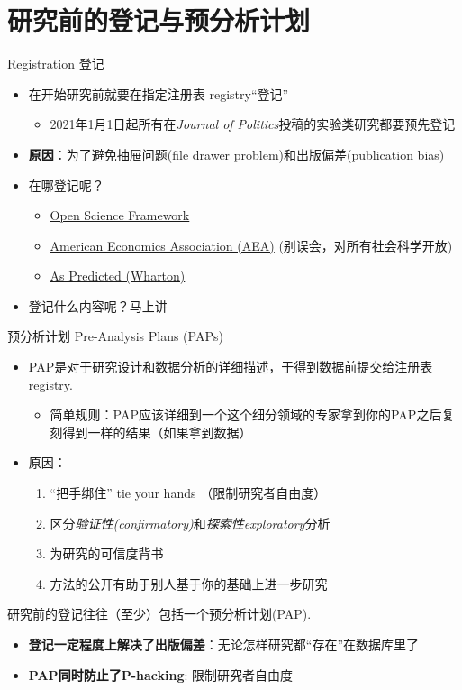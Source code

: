 \documentclass{beamer}
\begin{document}
\section{研究前的登记与预分析计划}
\begin{frame}{Registration 登记}
\begin{itemize}
    \item 在开始研究前就要在指定\alert{注册表 registry}“登记”
    \begin{itemize}
        \item 2021年1月1日起所有在\textit{Journal of Politics}投稿的实验类研究都要预先登记
    \end{itemize}
    \item \textbf{原因}：为了避免抽屉问题(file drawer problem)和出版偏差(publication bias)
    \item 在哪登记呢？
    \begin{itemize}
        \item \href{https://osf.io/}{Open Science Framework}
        \item \href{https://www.socialscienceregistry.org/}{American Economics Association (AEA)} (别误会，对所有社会科学开放)
        \item \href{https://aspredicted.org/}{As Predicted (Wharton)}
    \end{itemize}
    \item 登记什么内容呢？马上讲
\end{itemize}
\end{frame}

\begin{frame}{预分析计划 Pre-Analysis Plans (PAPs)}
\begin{itemize}
    \item PAP是对于\alert{研究设计}和\alert{数据分析}的详细描述，于\alert{得到数据前}提交给注册表registry.
    \begin{itemize}
        \item 简单规则：PAP应该详细到一个这个细分领域的专家拿到你的PAP之后复刻得到一样的结果（如果拿到数据）
    \end{itemize}
    \item 原因：
    \begin{enumerate}
        \item “把手绑住” tie your hands （限制研究者自由度）
        \item 区分\textit{验证性(confirmatory)}和\textit{探索性exploratory}分析
        \item 为研究的可信度背书
        \item 方法的公开有助于别人基于你的基础上进一步研究
    \end{enumerate}
\end{itemize}
研究前的登记往往（至少）包括一个预分析计划(PAP).
\begin{itemize}
    \item \textbf{登记一定程度上解决了出版偏差}：无论怎样研究都“存在”在数据库里了
    \item \textbf{PAP同时防止了P-hacking}: 限制研究者自由度
\end{itemize}
\end{frame}
\end{document}
